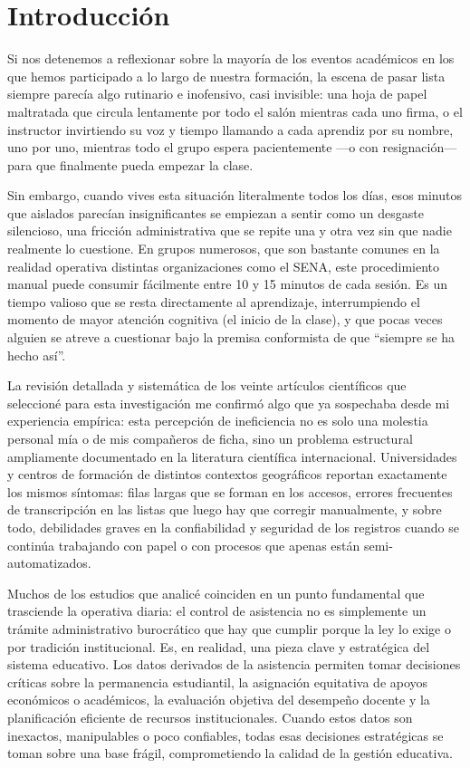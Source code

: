 \section{Introducción}

Si nos detenemos a reflexionar sobre la mayoría de los eventos académicos en los que hemos participado a lo largo de nuestra formación, la escena de pasar lista siempre parecía algo rutinario e inofensivo, casi invisible: una hoja de papel maltratada que circula lentamente por todo el salón mientras cada uno firma, o el instructor invirtiendo su voz y tiempo llamando a cada aprendiz por su nombre, uno por uno, mientras todo el grupo espera pacientemente —o con resignación— para que finalmente pueda empezar la clase. 

Sin embargo, cuando vives esta situación literalmente todos los días, esos minutos que aislados parecían insignificantes se empiezan a sentir como un desgaste silencioso, una fricción administrativa que se repite una y otra vez sin que nadie realmente lo cuestione. En grupos numerosos, que son bastante comunes en la realidad operativa distintas organizaciones como el SENA, este procedimiento manual puede consumir fácilmente entre 10 y 15 minutos de cada sesión. Es un tiempo valioso que se resta directamente al aprendizaje, interrumpiendo el momento de mayor atención cognitiva (el inicio de la clase), y que pocas veces alguien se atreve a cuestionar bajo la premisa conformista de que ``siempre se ha hecho así''.

La revisión detallada y sistemática de los veinte artículos científicos que seleccioné para esta investigación me confirmó algo que ya sospechaba desde mi experiencia empírica: esta percepción de ineficiencia no es solo una molestia personal mía o de mis compañeros de ficha, sino un problema estructural ampliamente documentado en la literatura científica internacional. Universidades y centros de formación de distintos contextos geográficos reportan exactamente los mismos síntomas: filas largas que se forman en los accesos, errores frecuentes de transcripción en las listas que luego hay que corregir manualmente, y sobre todo, debilidades graves en la confiabilidad y seguridad de los registros cuando se continúa trabajando con papel o con procesos que apenas están semi-automatizados.

Muchos de los estudios que analicé coinciden en un punto fundamental que trasciende la operativa diaria: el control de asistencia no es simplemente un trámite administrativo burocrático que hay que cumplir porque la ley lo exige o por tradición institucional. Es, en realidad, una pieza clave y estratégica del sistema educativo. Los datos derivados de la asistencia permiten tomar decisiones críticas sobre la permanencia estudiantil, la asignación equitativa de apoyos económicos o académicos, la evaluación objetiva del desempeño docente y la planificación eficiente de recursos institucionales. Cuando estos datos son inexactos, manipulables o poco confiables, todas esas decisiones estratégicas se toman sobre una base frágil, comprometiendo la calidad de la gestión educativa.

